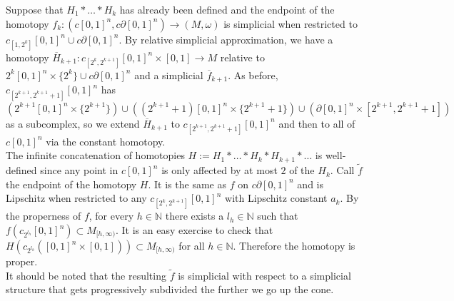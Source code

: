 \documentclass[a4paper,11pt]{article}
\theoremstyle{definition}
\theoremstyle{plain}
\theoremstyle{remark}
\begin{document}
{Suppose that $H_1\ast \dots \ast H_{k}$ has already been defined and the endpoint of the homotopy $f_k: (c[0,1]^n, c\partial [0,1]^n)\rightarrow (M,\omega)$ is simplicial when restricted to $c_{[1,2^{k}]}[0,1]^n\cup c\partial[0,1]^n$. By relative simplicial approximation, we have a homotopy $\overline{H}_{k+1}: c_{[2^{k},2^{k+1}]}[0,1]^n \times [0,1]\rightarrow M$ relative to $2^{k} [0,1]^n \times \{2^{k}\}\cup c\partial [0,1]^n$ and a simplicial $\overline{f}_{k+1}$. As before, $c_{[2^{k+1},2^{k+1}+1]}[0,1]^n$ has $(2^{k+1}[0,1]^n \times \{2^{k+1}\})\cup ((2^{k+1}+1)[0,1]^n \times \{2^{k+1}+1\}) \cup (\partial [0,1]^n \times [2^{k+1}, 2^{k+1}+1])$ as a subcomplex, so we extend $\overline{H}_{k+1}$ to $c_{[2^{k+1},2^{k+1}+1]}[0,1]^n$ and then to all of $c[0,1]^n$ via the constant homotopy.\\

The infinite concatenation of homotopies $H:= H_{1}\ast \dots \ast H_{k}  \ast H_{k+1}\ast \dots$ is well-defined since any point in $c[0,1]^n$ is only affected by at most $2$ of the $H_k$. Call $\tilde{f}$ the endpoint of the homotopy $H$. It is the same as $f$ on $c \partial[0,1]^n$ and is Lipschitz when restricted to any $c_{[2^{k}, 2^{k+1}]}[0,1]^n$ with Lipschitz constant $a_{k}$. By the properness of $f$, for every $h\in \mathbb{N}$ there exists a $l_{h}\in \mathbb{N}$ such that $f(c_{2^{l_h}}[0,1]^n)\subset M_{[h,\infty)}$. It is an easy exercise to check that $H(c_{2^{l_h}}([0,1]^n \times [0,1])) \subset M_{[h,\infty)}$ for all $h\in \mathbb{N}$. Therefore the homotopy is proper. \\

It should be noted that the resulting $\tilde{f}$ is simplicial with respect to a simplicial structure that gets progressively subdivided the further we go up the cone. \\


}
\end{document}
